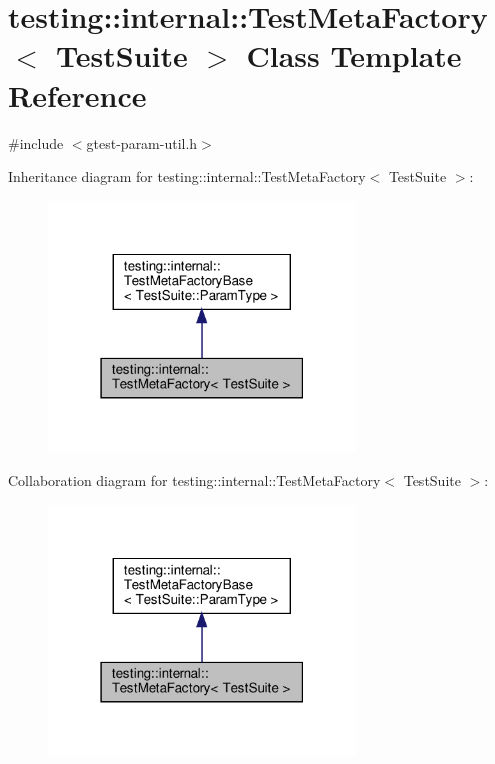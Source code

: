 \hypertarget{classtesting_1_1internal_1_1TestMetaFactory}{}\section{testing\+:\+:internal\+:\+:Test\+Meta\+Factory$<$ Test\+Suite $>$ Class Template Reference}
\label{classtesting_1_1internal_1_1TestMetaFactory}


{\ttfamily \#include $<$gtest-\/param-\/util.\+h$>$}



Inheritance diagram for testing\+:\+:internal\+:\+:Test\+Meta\+Factory$<$ Test\+Suite $>$\+:\nopagebreak
\begin{figure}[H]
\begin{center}
\leavevmode
\includegraphics[width=231pt]{classtesting_1_1internal_1_1TestMetaFactory__inherit__graph}
\end{center}
\end{figure}


Collaboration diagram for testing\+:\+:internal\+:\+:Test\+Meta\+Factory$<$ Test\+Suite $>$\+:\nopagebreak
\begin{figure}[H]
\begin{center}
\leavevmode
\includegraphics[width=231pt]{classtesting_1_1internal_1_1TestMetaFactory__coll__graph}
\end{center}
\end{figure}
